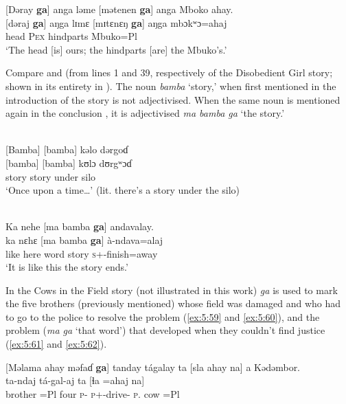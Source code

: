 \ea \label{ex:5:56}
{}[Dəray  \textbf{ga}]  anga  ləme  [mətenen  \textbf{ga}]  anga  Mboko  ahay.\\
\gll  {}[dəraj  \textbf{ga}]  aŋga  lɪmɛ    [mɪtɛnɛŋ     \textbf{ga}]    aŋga  mbɔkʷɔ=ahaj\\
      head  {\ADJ}  {\POSS}  \textsc{Pex}    hindparts  {\ADJ}    {\POSS}  Mbuko=Pl\\
\glt  ‘The head [is] ours; the hindparts [are] the Mbuko's.’ 
\z

Compare  and  (from lines 1 and 39, respectively of the Disobedient Girl story; shown in its entirety in ). The noun \textit{bamba} ‘story,’ when first mentioned in the introduction of the story  is not adjectivised. When the same noun is mentioned again in the conclusion , it is adjectivised \textit{ma bamba ga} ‘the story.’ 

\ea \label{ex:5:57}\\
{}[Bamba]  [bamba]  kəlo  dərgoɗ\\
\gll  {}[bamba]   [bamba]  kʊlɔ    dʊrgʷɔɗ\\
      story        story        under    silo\\
\glt  ‘Once upon a time…’ (lit. there’s a story under the silo)
\z

\ea \label{ex:5:58}\\
Ka  nehe  [ma  bamba \textbf{ga}]  andavalay.\\
\gll  ka  nɛhɛ  [ma    bamba \textbf{ga}]  à-ndava=alaj\\
      like  here  word   story     {\ADJ}     \textsc{s}+{\PFV}-finish=away\\
\glt  ‘It is like this the story ends.’  
\z

In the Cows in the Field story (not illustrated in this work) \textit{ga} is used to mark the five brothers (previously mentioned) whose field was damaged and who had to go to the police to resolve the problem (\ref{ex:5:59} and \ref{ex:5:60}), and the problem (\textit{ma ga} ‘that word’) that developed when they couldn’t find justice (\ref{ex:5:61} and \ref{ex:5:62}). 

\ea \label{ex:5:59}
{}[Məlama  ahay  məfaɗ  \textbf{ga}]  tanday  tágalay  ta  [sla  ahay  na]  a  Kədəmbor.\\
\gll  [məlama =ahaj   məfaɗ  \textbf{ga}]    ta-ndaj   tá-gal-aj          ta  [ɬa =ahaj   na]\\   
      brother     =Pl      four    {\ADJ}  \textsc{p}-{\PRG}  \textsc{p}+{\IFV}-drive-{\CL} \textsc{p}.{\DO}    cow =Pl       {\PSP}\\   
      
